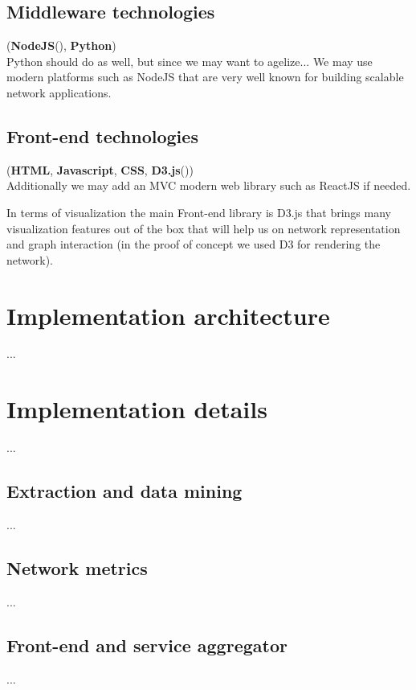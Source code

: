 \subsection{Middleware technologies}
(\textbf{NodeJS}(\cite{nodejs}), \textbf{Python})\\

Python should do as well, but since we may want to agelize... We may use modern platforms such as NodeJS that are very well known for
building scalable network applications.

\subsection{Front-end technologies}
(\textbf{HTML}, \textbf{Javascript}, \textbf{CSS}, \textbf{D3.js}(\cite{bostock2012d3}))\\

Additionally we may add an MVC modern web library such as ReactJS if needed.

In terms of visualization the main Front-end library is D3.js that brings many visualization features out of the box that will help us on
network representation and graph interaction (in the proof of concept we used D3 for rendering the network).

\section{Implementation architecture}
...
\section{Implementation details}
...
\subsection{Extraction and data mining}
...
\subsection{Network metrics}
...
\subsection{Front-end and service aggregator}
...

